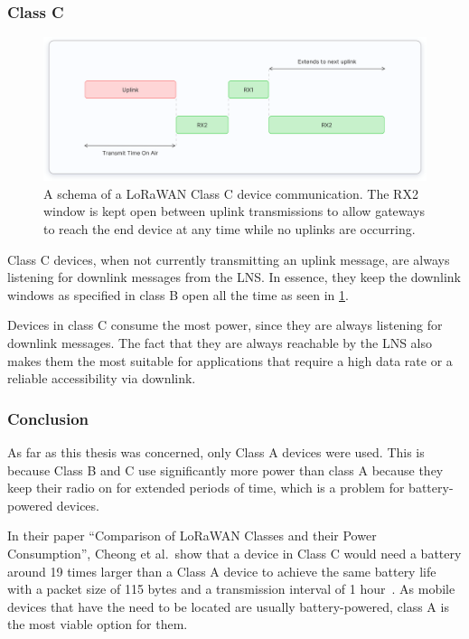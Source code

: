 \subsubsection{Class C}

\begin{figure}[htbp]
    \centering
    \includegraphics[width=1\textwidth]{pictures/device-classes/class-c.png}
    \caption{
        A schema of a \ac{LoRaWAN} Class C device communication.
        The RX2 window is kept open between uplink transmissions to allow gateways to reach the end device at any time while no uplinks are occurring.~\protect\cite{the_things_industries_bv_device_nodate}
    }\label{pic:lorawan-device-class-c-schema}
\end{figure}

Class C devices, when not currently transmitting an uplink message, are always listening for downlink messages from the \ac{LNS}.
In essence, they keep the downlink windows as specified in class B open all the time as seen in \cref{pic:lorawan-device-class-c-schema}.

Devices in class C consume the most power, since they are always listening for downlink messages.
The fact that they are always reachable by the \ac{LNS} also makes them the most suitable for applications that require a high data rate or a reliable accessibility via downlink.

\subsubsection{Conclusion}

As far as this thesis was concerned, only Class A devices were used.
This is because Class B and C use significantly more power than class A because they keep their radio on for extended periods of time, which is a problem for battery-powered devices.

In their paper ``Comparison of LoRaWAN Classes and their Power Consumption'', Cheong et al.\ show that a device in Class C would need a battery around 19 times larger than a Class A device to achieve the same battery life with a packet size of 115 bytes and a transmission interval of 1 hour~\cite{cheong_comparison_2017}.
As mobile devices that have the need to be located are usually battery-powered, class A is the most viable option for them.

